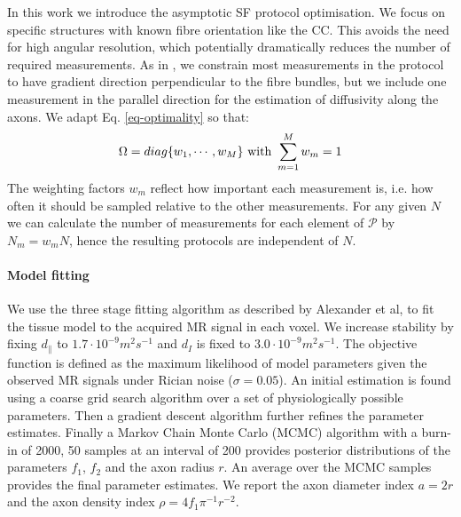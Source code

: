 In this work we introduce the asymptotic SF protocol optimisation. We focus on specific structures with known fibre orientation like the CC. This avoids the need for high angular resolution, which potentially dramatically reduces the number of required measurements. As in \cite{assaf2008,barazany2009}, we constrain most measurements in the protocol to have gradient direction perpendicular to the fibre bundles, but we include one measurement in the parallel direction for the estimation of diffusivity along the axons. We adapt Eq. \ref{eq-optimality} so that: 
\begin{equation}
	\Omega=diag\{w_1,\cdots,w_M\} \mbox{ with } \sum_{m=1}^{M}w_m=1
\end{equation}
The weighting factors $w_m$ reflect how important each measurement is, i.e. how often it should be sampled relative to the other measurements. For any given $N$ we can calculate the number of measurements for each element of $\mathcal{P}$ by $N_{m}=w_mN$, hence the resulting protocols are independent of $N$.
\paragraph{Model fitting}
We use the three stage fitting algorithm as described by Alexander et al\cite{alexander2009}, to fit the tissue model to the acquired MR signal in each voxel. We increase stability by fixing $d_\parallel$ to $1.7\cdot 10^{-9} m^2s^{-1}$ and $d_I$ is fixed to $3.0\cdot 10^{-9} m^2s^{-1}$\cite{assaf2008,barazany2009,alexander2009}. The objective function is defined as the maximum likelihood of model parameters given the observed MR signals under Rician noise ($\sigma=0.05$). An initial estimation is found using a coarse grid search algorithm over a set of physiologically possible parameters. Then a gradient descent algorithm further refines the parameter estimates. Finally a Markov Chain Monte Carlo (MCMC) algorithm with a burn-in of 2000, 50 samples at an interval of 200 provides posterior distributions of the parameters $f_1$, $f_2$ and the axon radius $r$. An average over the MCMC samples provides the final parameter estimates. We report the axon diameter index $a=2r$ and the axon density index $\rho=4f_1\pi^{-1}r^{-2}$.

